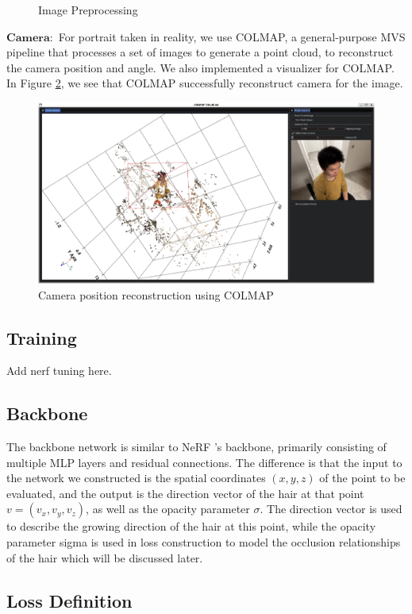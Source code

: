 \documentclass[12pt]{article}
\begin{document}
\begin{figure}[h]
        \caption{Image Preprocessing}
        \label{fig:image_prep}
    \end{figure}

    $\mathbf{Camera:}$ For portrait taken in reality, we use COLMAP, a general-purpose MVS pipeline that processes a set of images to generate a point cloud, to reconstruct the camera position and angle. We also implemented a visualizer for COLMAP. In Figure \ref{fig:colmap_demo}, we see that COLMAP successfully reconstruct camera for the image.
    \begin{figure}[h]
        \centering
        \includegraphics[width=0.5\linewidth]{project-milestone/images/colmap_demo.png}
        \caption{Camera position reconstruction using COLMAP}
        \label{fig:colmap_demo}
    \end{figure}

    \subsection{Training}

    Add nerf tuning here.
    
    \subsection{Backbone}
    
    The backbone network is similar to NeRF \cite{mildenhall_nerf_2020}'s backbone, primarily consisting of multiple MLP layers and residual connections. The difference is that the input to the network we constructed is the spatial coordinates $(x, y, z)$ of the point to be evaluated, and the output is the direction vector of the hair at that point $v = (v_x, v_y, v_z)$, as well as the opacity parameter $\sigma$. The direction vector is used to describe the growing direction of the hair at this point, while the opacity parameter sigma is used in loss construction to model the occlusion relationships of the hair which will be discussed later.
    
    \subsection{Loss Definition}
    
\end{document}
